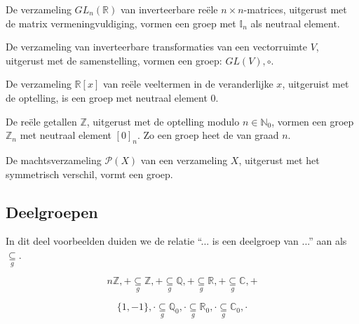 \documentclass[main.tex]{subfiles}
\begin{document}
\begin{vb}
  De verzameling $GL_{n}(\mathbb{R})$ van inverteerbare re\"ele $n\times n$-matrices, uitgerust met de matrix vermeningvuldiging, vormen een groep met $\mathbb{I}_{n}$ als neutraal element.\\
\commn \cycln
\end{vb}

\begin{vb}
  De verzameling van inverteerbare transformaties van een vectorruimte $V$, uitgerust met de samenstelling, vormen een groep: $GL(V),\circ$.
\commn \cycln
\end{vb}

\begin{vb}
  De verzameling $\mathbb{R}[x]$ van re\"ele veeltermen in de veranderlijke $x$, uitgeruist met de optelling, is een groep met neutraal element $0$.\\
\commj \cycln
\end{vb}

\begin{vb}
  De re\"ele getallen $\mathbb{Z}$, uitgerust met de optelling modulo $n\in \mathbb{N}_{0}$, vormen een groep $\mathbb{Z}_{n}$ met neutraal element $[0]_{n}$. Zo een groep heet de  van graad $n$.\\
\commj {}
\end{vb}

\begin{vb}
  De machtsverzameling $\mathcal{P}(X)$ van een verzameling $X$, uitgerust met het symmetrisch verschil, vormt een groep.
\commj \cycln
\end{vb}

\subsection{Deelgroepen}
In dit deel voorbeelden duiden we de relatie ``... is een deelgroep van ...'' aan als $\underset{g}{\subseteq}$.

\begin{vb}
  \[ n\mathbb{Z},+ \underset{g}{\subseteq} \mathbb{Z},+ \underset{g}{\subseteq} \mathbb{Q},+ \underset{g}{\subseteq} \mathbb{R},+ \underset{g}{\subseteq} \mathbb{C},+ \]
\end{vb}

\begin{vb}
  \[ \{ 1,-1\},\cdot \underset{g}{\subseteq} \mathbb{Q}_{0},\cdot \underset{g}{\subseteq} \mathbb{R}_{0},\cdot \underset{g}{\subseteq} \mathbb{C}_{0},\cdot \]
\end{vb}
\end{document}
